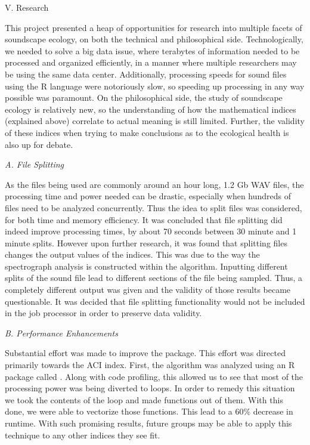 \begin{center}
V. Research
\end{center}
\begin{flushleft}
\setlength{\parindent}{0.125in}
This project presented a heap of opportunities for research into multiple facets of soundscape ecology, on both the technical and philosophical side. Technologically, we needed to solve a big data issue, where terabytes of information needed to be processed and organized efficiently, in a manner where multiple researchers may be using the same data center. Additionally, processing speeds for sound files using the R language were notoriously slow, so speeding up processing in any way possible was paramount. On the philosophical side, the study of soundscape ecology is relatively new, so the understanding of how the mathematical indices (explained above) correlate to actual meaning is still limited. Further, the validity of these indices when trying to make conclusions as to the ecological health is also up for debate.\par

\noindent\textit{A. File Splitting}\par
As the files being used are commonly around an hour long, 1.2 Gb WAV files, the processing time and power needed can be drastic, especially when hundreds of files need to be analyzed concurrently. Thus the idea to split files was considered, for both time and memory efficiency. It was concluded that file splitting did indeed improve processing times, by about 70 seconds between 30 minute and 1 minute splits. However upon further research, it was found that splitting files changes the output values of the indices. This was due to the way the spectrograph analysis is constructed within the algorithm. Inputting different splits of the sound file lead to different sections of the file being sampled. Thus, a completely different output was given and the validity of those results became questionable. It was decided that file splitting functionality would not be included in the job processor in order to preserve data validity.\par

\noindent\textit{B. Performance Enhancements}\par
Substantial effort was made to improve the  package. This effort was directed primarily towards the ACI index. First, the algorithm was analyzed using an R package called . Along with code profiling, this allowed us to see that most of the processing power was being diverted to  loops. In order to remedy this situation we took the contents of the  loop and made functions out of them. With this done, we were able to vectorize those functions. This lead to a 60\% decrease in runtime. With such promising results, future groups may be able to apply this technique to any other indices they see fit.\par


\end{flushleft}
